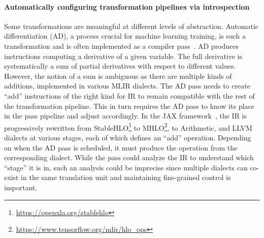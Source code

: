 \documentclass[screen,nonacm,authorversion]{acmart}
\begin{document}
\paragraph{Automatically configuring transformation pipelines via introspection}
Some transformations are meaningful at different levels of abstraction.
Automatic differentiation (AD), a process crucial for machine learning training, is such a transformation and is often implemented as a compiler pass~\cite{enzyme}.
AD produces instructions computing a derivative of a given variable. The full derivative is systematically a sum of partial derivatives with respect to different values. However, the notion of a sum is ambiguous as there are multiple kinds of additions, implemented in various MLIR dialects. The AD pass needs to create ``add'' instructions of the right kind for IR to remain compatible with the rest of the transformation pipeline. This in turn requires the AD pass to know its place in the pass pipeline and adjust accordingly.
In the JAX framework~\cite{jax}, the IR is progressively rewritten from StableHLO\footnote{\url{https://openxla.org/stablehlo}} to MHLO\footnote{\url{https://www.tensorflow.org/mlir/hlo_ops}}, to Arithmetic, and LLVM dialects at various stages, each of which defines an ``add'' operation. Depending on when the AD pass is scheduled, it must produce the operation from the corresponding dialect.
While the pass could analyze the IR to understand which ``stage'' it is in, such an analysis could be imprecise since multiple dialects can co-exist in the same translation unit and maintaining fine-grained control is important.

\end{document}
